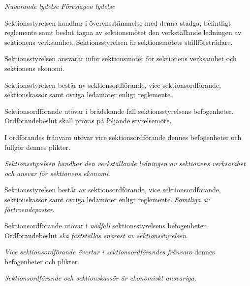 \documentclass{article}
\newenvironment{lydelse}
    {\begin{paracol}{2}%
        \emph{Nuvarande lydelse}%
        \switchcolumn%
        \emph{Föreslagen lydelse}%
    \end{paracol}%
    \begin{enumerate}[label=\thesubsection.\arabic*]%
    \begin{paracol}{2}%
    }{\end{paracol}\end{enumerate}}
\begin{document}
\begin{lydelse}
  \setcounter{section}{7}
  \setcounter{subsection}{1}
  \item Sektionsstyrelsen handhar i överensstämmelse med denna stadga, befintligt reglemente samt beslut tagna av sektionsmötet den verkställande ledningen av sektionens verksamhet. Sektionsstyrelsen är sektionsmötets ställföreträdare.

  \setcounter{subsection}{3}
  \setcounter{enumi}{0}
  \item Sektionsstyrelsen ansvarar inför sektionsmötet för sektionens verksamhet och sektionens ekonomi.

  \setcounter{section}{7}
  \setcounter{subsection}{2}
  \item Sektionsstyrelsen består av sektionsordförande, vice sektionsordförande, sektionskassör samt övriga ledamöter enligt reglemente.

  \setcounter{subsection}{9}
  \item Sektionsordförande utövar i brådskande fall sektionsstyrelsens befogenheter. Ordförandebeslut skall prövas på följande styrelsemöte.

  \item I ordförandes frånvaro utövar vice sektionsordförande dennes befogenheter och fullgör dennes plikter.
\switchcolumn
  \item \emph{Sektionsstyrelsen handhar den verkställande ledningen av sektionens verksamhet och ansvar för sektionens ekonomi}.

  \item Sektionsstyrelsen består av sektionsordförande, vice sektionsordförande, sektionskassör samt övriga ledamöter enligt reglemente.
    \emph{Samtliga är förtroendeposter.}

  \item Sektionsordförande utövar i \emph{nödfall} sektionsstyrelsens befogenheter.
    Ordförandebeslut \emph{ska fastställas snarast av sektionsstyrelsen}.

  \item \emph{Vice sektionsordförande övertar i sektionsordförandes frånvaro} dennes befogenheter och plikter.

  \item \emph{Sektionsordförande och sektionskassör är ekonomiskt ansvariga.}
\end{lydelse}
\setcounter{section}{6}
\setcounter{subsection}{0}

\end{document}
